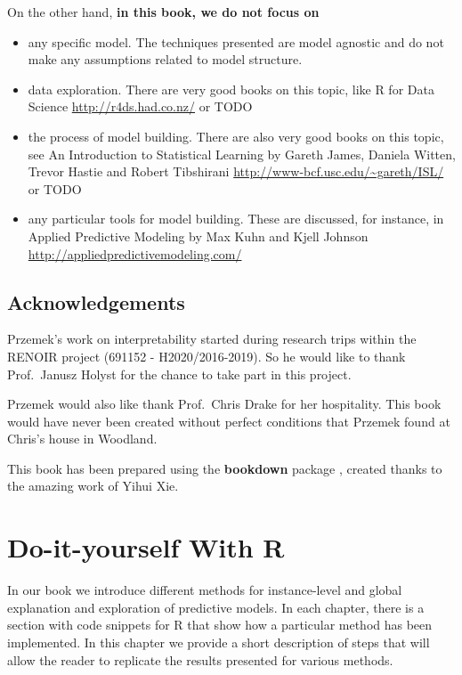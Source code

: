 \documentclass[12pt,]{krantz}
\providecommand{\tightlist}{%
  \setlength{\itemsep}{0pt}\setlength{\parskip}{0pt}}
\theoremstyle{definition}
\theoremstyle{definition}
\theoremstyle{definition}
\theoremstyle{remark}
\begin{document}
On the other hand, \textbf{in this book, we do not focus on}

\begin{itemize}
\tightlist
\item
  any specific model. The techniques presented are model agnostic and do
  not make any assumptions related to model structure.
\item
  data exploration. There are very good books on this topic, like R for
  Data Science \url{http://r4ds.had.co.nz/} or TODO
\item
  the process of model building. There are also very good books on this
  topic, see An Introduction to Statistical Learning by Gareth James,
  Daniela Witten, Trevor Hastie and Robert Tibshirani
  \url{http://www-bcf.usc.edu/~gareth/ISL/} or TODO
\item
  any particular tools for model building. These are discussed, for
  instance, in Applied Predictive Modeling by Max Kuhn and Kjell Johnson
  \url{http://appliedpredictivemodeling.com/}
\end{itemize}

\hypertarget{thanksto}{%
\subsection{Acknowledgements}\label{thanksto}}

Przemek's work on interpretability started during research trips within
the RENOIR project (691152 - H2020/2016-2019). So he would like to thank
Prof.~Janusz Holyst for the chance to take part in this project.

Przemek would also like thank Prof.~Chris Drake for her hospitality.
This book would have never been created without perfect conditions that
Przemek found at Chris's house in Woodland.

This book has been prepared using the \textbf{bookdown} package
\citep{R-bookdown}, created thanks to the amazing work of Yihui Xie.

\hypertarget{doItYourselfWithR}{%
\section{Do-it-yourself With R}\label{doItYourselfWithR}}

In our book we introduce different methods for instance-level and global
explanation and exploration of predictive models. In each chapter, there
is a section with code snippets for R that show how a particular method
has been implemented. In this chapter we provide a short description of
steps that will allow the reader to replicate the results presented for
various methods.
\end{document}
